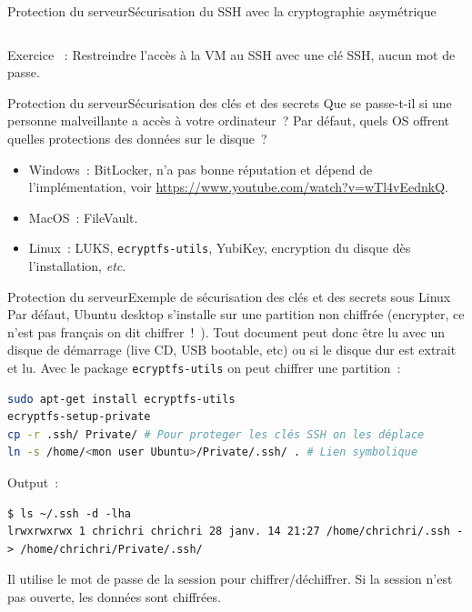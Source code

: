 \documentclass{beamer}
\begin{document}
\begin{frame}{Protection du serveur}{Sécurisation du SSH avec la cryptographie asymétrique}
\begin{footnotesize}
\begin{columns}
\begin{column}{0.4\textwidth}
                \end{column}
            \end{columns}
            \flushleft
            Exercice \execcounterdispinc{}~:
            Restreindre l'accès à la VM au SSH avec une clé SSH, aucun mot de passe.
        \end{footnotesize}
    \end{frame}

    \begin{frame}{Protection du serveur}{Sécurisation des clés et des secrets}
        Que se passe-t-il si une personne malveillante a accès à votre ordinateur~?
        \bigbreak
        Par défaut, quels OS offrent quelles protections des données sur le disque~?
        \pause
        \bigbreak
        \begin{itemize}
            \item Windows~: BitLocker, n'a pas bonne réputation et dépend de l'implémentation, voir \url{https://www.youtube.com/watch?v=wTl4vEednkQ}.
            \item MacOS~: FileVault.
            \item Linux~: LUKS, \lstinline{ecryptfs-utils}, YubiKey, encryption du disque dès l'installation, \textit{etc}.
        \end{itemize}
    \end{frame}

    \begin{frame}[fragile]{Protection du serveur}{Exemple de sécurisation des clés et des secrets sous Linux}
        Par défaut, Ubuntu desktop s’installe sur une partition non
        chiffrée (encrypter, ce n’est pas français on dit chiffrer~!~).
        Tout document peut donc être lu avec un disque de
        démarrage (live CD, USB bootable, etc) ou si le disque dur
        est extrait et lu.
        \bigbreak
        Avec le package \lstinline{ecryptfs-utils} on peut chiffrer une partition~:
        \begin{lstlisting}[language=bash]
sudo apt-get install ecryptfs-utils
ecryptfs-setup-private
cp -r .ssh/ Private/ # Pour proteger les clés SSH on les déplace
ln -s /home/<mon user Ubuntu>/Private/.ssh/ . # Lien symbolique
        \end{lstlisting}
        Output~:
        \begin{lstlisting}
$ ls ~/.ssh -d -lha
lrwxrwxrwx 1 chrichri chrichri 28 janv. 14 21:27 /home/chrichri/.ssh -> /home/chrichri/Private/.ssh/
        \end{lstlisting}
        Il utilise le mot de passe de la session pour chiffrer/déchiffrer.
        Si la session n'est pas ouverte, les données sont chiffrées.
    \end{frame}
\end{document}
